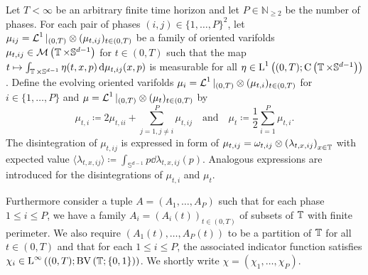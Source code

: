 \begin{definition}
	\label{de_giorgi_varifold_solutions_for_mmcf}
	Let $T < \infty $ be an arbitrary finite time horizon and let $ P \in 
	\mathbb{ N }_{ \geq 2 } $ be the number of phases. For each 
	pair of phases $ ( i , j ) \in \{ 1 , \dotsc, P \}^{ 2 } $, let 
	$ \mu_{ i j } = \operatorname{\mathcal{L}}^{ 1 }|_{ ( 0 , T ) } \otimes ( \mu_{ t , i j } )_{ t 
	\in ( 0 , T ) } $ be a family of oriented 
	varifolds 
	$ \mu_{ t , ij } \in \mathcal{ M } \left(
	\operatorname{\mathbb{T}} \times \mathbb{ S }^{ d - 1 }
	\right) $ for
	$ t \in ( 0 , T ) $ such that the map 
	$ t \mapsto \int_{ \operatorname{\mathbb{T}} \times \mathbb{ S }^{ d - 1 } }
	\eta ( t , x , p )
	\dd{ \mu_{ t ,i j } ( x, p ) }$
	is measurable for all
	$ \eta \in \operatorname{L}^{ 1 } \left(	
	( 0 , T ) ; \operatorname{C} \left( \operatorname{\mathbb{T}} \times \mathbb{ S }^{ d- 1 } 
	\right) 
	\right) $.
	Define the evolving oriented varifolds $ \mu_{ i } = \operatorname{\mathcal{L}}^{ 1 }|_{ ( 0 , T 
		) } \otimes ( \mu_{ t , i } )_{ t \in ( 0 , T ) } $ for $ i \in \{ 1, 
	\dotsc, P \} $ and $ \mu = \operatorname{\mathcal{L}}^{ 1 }|_{ ( 0 , T ) } \otimes ( \mu_{ t 
	} )_{ t \in ( 0 , T ) } $ by 
	\begin{equation}
		\label{moon_equation}
		\mu_{ t , i }
		\coloneqq
		2 \mu_{ t , i i }
		+
		\sum_{ j = 1 , j \neq i }^{ P }
		\mu_{ t , i j }
		\quad \text{and} \quad
		\mu_{ t }
		\coloneqq
		\frac{ 1 }{ 2 }
		\sum_{ i = 1 }^{ P }
		\mu_{ t, i }.
	\end{equation}
	The disintegration of $ \mu_{ t , i j } $ is expressed in form of 
	$ \mu_{ t , i j } = \omega_{ t ,i j } \otimes \left( \lambda _{ t , x , i j 
	} \right)_{ x \in \operatorname{\mathbb{T}} } $ with expected value
	$ \langle \lambda_{ t , x , i j } \rangle 
	\coloneqq
	\int_{ \mathbb{ S }^{ d - 1 } }
	p 
	\dd{ \lambda_{ t , x , i j } ( p ) } $.
	Analogous expressions are introduced for the disintegrations of $ \mu_{ t, 
		i } $ and $ \mu_{ t } $.
	
	Furthermore consider a tuple 
	$ A = \left( A_{ 1 } , \dotsc , A_{ P } \right) $ 
	such that for each phase $ 1 \leq i \leq P $, we have a family
	$ A_{ i } = ( A_{ i } ( t ) )_{ t \in ( 0 , T ) } $ of subsets of $ 
	\operatorname{\mathbb{T}} $ with finite perimeter. We also require 
	$ \left( A_{ 1 } ( t ) , \dotsc, A_{ P } ( t ) \right) $
	to be a partition of $ \operatorname{\mathbb{T}} $ for all $ t \in ( 0 , T ) $ and 
	that for each $ 1 \leq i \leq P $, the associated indicator function 
	satisfies 
	$ \chi_{ i } \in \operatorname{L}^{ \infty } \left(
	( 0 , T ) ;
	\operatorname{BV} \left( \operatorname{\mathbb{T}} ; \{ 0 , 1 \} \right)
	\right) $.
	We shortly write $ \chi = \left( \chi_{ 1 } , \dotsc, \chi_{ P } \right) $.
	

\end{definition}

